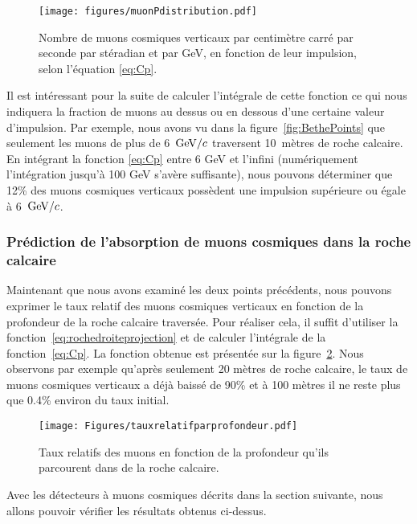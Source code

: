 \documentclass[a4paper, 12pt]{article}
\begin{document}
\begin{spacing}{1.5}
\begin{figure}[t]
\begin{center}
\texttt{[image: figures/muonPdistribution.pdf]}
\caption{\label{fig:muonPdistribution} Nombre de muons cosmiques verticaux par centimètre carré par seconde par stéradian et par GeV, en fonction de leur impulsion, selon l'équation \ref{eq:Cp}.}
\end{center}
\end{figure}

Il est intéressant pour la suite de calculer l'intégrale de cette fonction ce qui nous indiquera la fraction de muons au dessus ou en dessous d'une certaine valeur d'impulsion. Par exemple, nous avons vu dans la figure~\ref{fig:BethePoints} que seulement les muons de plus de 6~${\rm GeV}/c$ traversent 10~mètres de roche calcaire. En intégrant la fonction \ref{eq:Cp} entre 6 GeV et l'infini (numériquement l'intégration jusqu'à 100 GeV s'avère suffisante), nous pouvons déterminer que 12\% des muons cosmiques verticaux possèdent une impulsion supérieure ou égale à 6~${\rm GeV}/c$.

\subsubsection{Prédiction de l'absorption de muons cosmiques dans la roche calcaire}

Maintenant que nous avons examiné les deux points précédents, nous pouvons exprimer le taux relatif des muons cosmiques verticaux en fonction de la profondeur de la roche calcaire traversée. Pour réaliser cela, il suffit d'utiliser la fonction~\ref{eq:rochedroiteprojection} et de calculer l'intégrale de la fonction~\ref{eq:Cp}. La fonction obtenue est présentée sur la figure~\ref{fig:tauxrelatifparprofondeur}. Nous observons par exemple qu'après seulement 20 mètres de roche calcaire, le taux de muons cosmiques verticaux a déjà baissé de 90\% et à 100 mètres il ne reste plus que 0.4\% environ du taux initial. 

\begin{figure}[t]
\begin{center}
\texttt{[image: Figures/tauxrelatifparprofondeur.pdf]}
\caption{\label{fig:tauxrelatifparprofondeur} Taux relatifs des muons en fonction de la profondeur qu'ils parcourent dans de la roche calcaire.}
\end{center}
\end{figure}

Avec les détecteurs à muons cosmiques décrits dans la section suivante, nous allons pouvoir vérifier les résultats obtenus ci-dessus. 


\end{spacing}
\end{document}
